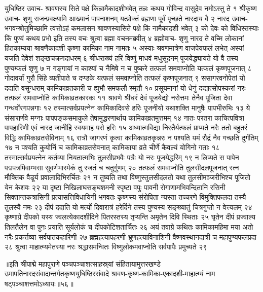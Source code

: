 युधिष्ठिर उवाच-
श्रावणस्य सिते पक्षे किन्नामैकादशीभवेत् 
तन्नः कथय गोविन्द वासुदेव नमोऽस्तु ते १
श्रीकृष्ण उवाच-
शृणु राजन्प्रवक्ष्यामि आख्यानं पापनाशनम् 
यत्प्रोक्तं ब्रह्मणा पूर्वं पृच्छते नारदाय वै २
नारद उवाच-
भगवन्श्रोतुमिच्छामि त्वत्तोऽहं कमलासन 
श्रावणस्यासिते पक्षे किं नामैकादशी भवेत् ३
को देवः को विधिस्तस्याः किं पुण्यं कथय प्रभो 
इति तस्य वचः श्रुत्वा ब्रह्मा वचनमब्रवीत् ४
ब्रह्मोवाच-
शृणु नारद ते वच्मि लोकानां हितकाम्यया 
श्रावणैकादशी कृष्णा कामिका नाम नामतः ५
अस्याः श्रवणमात्रेण वाजपेयफलं लभेत् 
अस्यां यजति देवेशं शङ्खचक्रगदाधरम् ६
श्रीधराख्यं हरिं विष्णुं माधवं मधुसूदनम् 
पूजयेद्ध्यायते यो वै तस्य पुण्यम्फलं शृणु ७
न गङ्गायां न काश्यां च नैमिषे न च पुष्करे 
तत्फलं समवाप्नोति यत्फलं कृष्णपूजनात् ८
गोदावर्यां गुरौ सिंहे व्यतीपाते च दण्डके 
यत्फलं समवाप्नोति तत्फलं कृष्णपूजनात् ९
ससागरवनोपेतां यो ददाति वसुन्धराम् 
कामिकाव्रतकारी च ह्युभौ समफलौ स्मृतौ १०
प्रसूयमानां यो धेनुं दद्यात्सोपस्करां नरः 
तत्फलं समवाप्नोति कामिकाव्रतकारकः ११
श्रावणे श्रीधरं देवं पूजयेद्यो नरोत्तमः 
तेनैव पूजिता देवा गन्धर्वोरगपन्नगाः १२
तस्मात्सर्वप्रयत्नेन कामिकादिवसे हरिः 
पूजनीयो यथाशक्ति मानुषैः पापभीरुभिः १३
ये संसारार्णवे मग्नाः पापपङ्कसमाकुले 
तेषामुद्धरणार्थाय कामिकाव्रतमुत्तमम् १४
नातः परतरा काचित्पवित्रा पापहारिणी 
एवं नारद जानीहि स्वयमाह परो हरिः १५
अध्यात्मविद्या निरतैर्यत्फलं प्राप्यते नरैः 
ततो बहुतरं विद्धि कामिकाव्रतसेविनाम् १६
रात्रौ जागरणं कृत्वा कामिकाव्रतकृन्नरः 
न पश्यति यमं रौद्रं नैव गच्छति दुर्गतिम् १७
न पश्यति कुयोनिं च कामिकाव्रतसेवनात् 
कामिकाया व्रते चीर्णे कैवल्यं योगिनो गताः १८
तस्मात्सर्वप्रयत्नेन कर्तव्या नियतात्मभिः 
तुलसीप्रभवैः पत्रैः यो नरः पूजयेद्धरिम् १९
न लिप्यते स पापेन पद्मपत्रमिवाम्भसा 
सुवर्णभारमेकं तु रजतं च चतुर्गुणम् २०
तत्फलं समवाप्नोति तुलसीदलपूजनात् 
रत्न मौक्तिक वैडूर्य प्रवालादिभिरर्चितः २१
न तुष्यति तथा विष्णुस्तुलसीदलतो यथा 
तुलसीमञ्जरीभिश्च पूजितो येन केशवः २२
या दृष्टा निखिलाघसङ्घशमनी स्पृष्टा वपुः पावनी
रोगाणामभिवन्दितानि रसिनी सिक्तान्तकत्रासिनी 
प्रत्यासत्तिविधायिनी भगवतः कृष्णस्य संरोपिता
न्यस्ता तच्चरणे विमुक्तिफलदा तस्यै तुलस्यै नमः २३
दीपं ददाति यो मर्त्यो दिवारात्रं हरेर्दिने 
तस्य पुण्यस्य सङ्ख्यातुं चित्रगुप्तो न वेत्त्यलम् २४
कृष्णाग्रे दीपको यस्य ज्वलत्येकादशीदिने 
पितरस्तस्य तृप्यन्ति अमृतेन दिवि स्थिताः २५
घृतेन दीपं प्रज्वाल्य तिलतैलेन वा पुनः 
प्रयाति सूर्यलोकं च दीपकोटिशतार्चितः २६
अयं तवाग्रे कथितः कामिकामहिमा मया 
अतो नरैः प्रकर्त्तव्या सर्वपातकहारिणी २७
ब्रह्महत्यापहरणी भ्रूणहत्याविनाशिनी 
वैष्णवस्थानदात्री च महापुण्यफलप्रदा २८
श्रुत्वा माहात्म्यमेतस्या नरः श्रद्धासमन्वितः 
विष्णुलोकमवाप्नोति सर्वपापैः प्रमुच्यते २९

॥इति श्रीपाद्मे महापुराणे पञ्चपञ्चाशत्साहस्र्यां संहितायामुत्तरखण्डे उमापतिनारदसंवादान्तर्गतकृष्णयुधिष्ठिरसंवादे श्रावण-कृष्ण-कामिका-एकादशी-माहात्म्यं नाम षट्पञ्चाशत्तमोऽध्यायः॥५६॥


